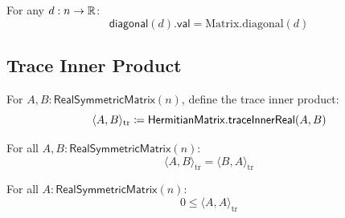 \begin{lemma}
For any $d : n \to \mathbb{R}$:
\[ \mathsf{diagonal}(d).\mathsf{val} = \mathrm{Matrix.diagonal}(d) \]
\end{lemma}

\subsection{Trace Inner Product}

\begin{definition}[traceInner]
For $A, B : \mathsf{RealSymmetricMatrix}(n)$, define the trace inner product:
\[ \langle A, B \rangle_{\mathrm{tr}} \coloneqq \mathsf{HermitianMatrix.traceInnerReal}(A, B) \]
\end{definition}

\begin{theorem}
For all $A, B : \mathsf{RealSymmetricMatrix}(n)$:
\[ \langle A, B \rangle_{\mathrm{tr}} = \langle B, A \rangle_{\mathrm{tr}} \]
\end{theorem}

\begin{theorem}
For all $A : \mathsf{RealSymmetricMatrix}(n)$:
\[ 0 \le \langle A, A \rangle_{\mathrm{tr}} \]
\end{theorem}
